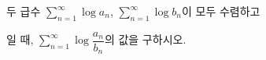 두 급수 $\displaystyle\sum_{n=1}^{\infty}\log a_n$, $\displaystyle\sum_{n=1}^{\infty}\log b_n$이 모두 수렴하고 \par\smallskip{}\par\smallskip\noindent 일 때, $\displaystyle\sum_{n=1}^{\infty}\log\dfrac{a_n}{b_n}$의 값을 구하시오.
